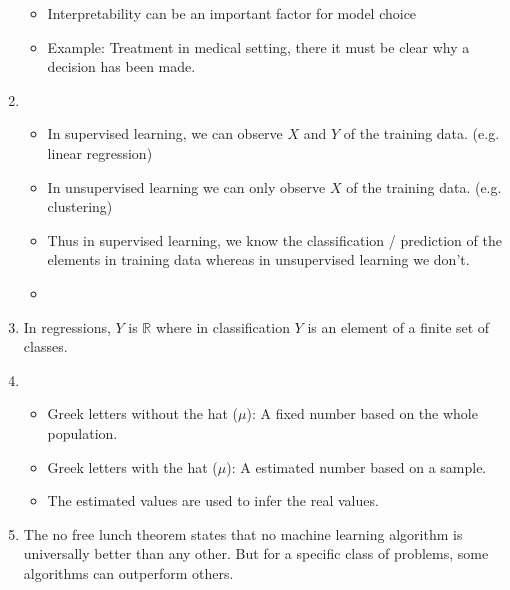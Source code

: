 \documentclass[11pt]{article}
\begin{document}
\begin{enumerate}
\begin{itemize}
              \item Interpretability can be an important factor for model choice
              \item Example: Treatment in medical setting, there it must be clear why a decision has been made.
    \end{itemize}
    \item \begin{itemize}
              \item In supervised learning, we can observe $X$ and $Y$ of the training data. (e.g. linear regression)
              \item In unsupervised learning we can only observe $X$ of the training data. (e.g. clustering)
              \item Thus in supervised learning, we know the classification / prediction of the elements in training data
              whereas in unsupervised learning we don't.
    \end{itemize}
    \begin{itemize}
        \item
    \end{itemize}
    \item In regressions, $Y$ is $\mathbb{R}$ where in classification $Y$ is an element of a finite set of classes.
    \item \begin{itemize}
              \item Greek letters without the hat ($\mu$): A fixed number based on the whole population.
              \item Greek letters with the hat ($\hat{\mu}$): A estimated number based on a sample.
              \item The estimated values are used to infer the real values.
    \end{itemize}
    \item The no free lunch theorem states that no machine learning algorithm is universally better than any other.
    But for a specific class of problems, some algorithms can outperform others.
\end{enumerate}
\end{document}
